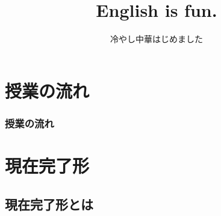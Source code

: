 \documentclass[aspectratio=169,xcolor={dvipsnames,table}]{beamer}
\title{English is fun.}
\subtitle{冷やし中華はじめました}
\author{}
\institute[]{}
\date[]
\begin{document}
\begin{frame}[plain]
  \titlepage
\end{frame}

\section*{授業の流れ}
\begin{frame}[plain]
  \frametitle{授業の流れ}
  \tableofcontents
\end{frame}

\section{現在完了形}
\subsection{現在完了形とは}
\end{document}
